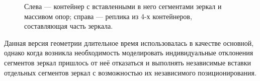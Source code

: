 \begin{figure}[H]
\begin{minipage}[t]{0.495\textwidth}
\end{minipage}
\caption{Слева --- контейнер с вставленными в него сегментами зеркал и массивом опор; справа --- реплика из 4-х контейнеров, составляющая часть зеркала.}
\label{fig:ReplicaMirror}
\end{figure}

Данная версия геометрии длительное время использовалась в качестве основной, однако когда возникла необходимость моделировать индивидуальные отклонения сегментов зеркал пришлось от неё отказаться и выполнять независимые вставки отдельных сегментов зеркал с возможностью их независимого позиционирования. %
